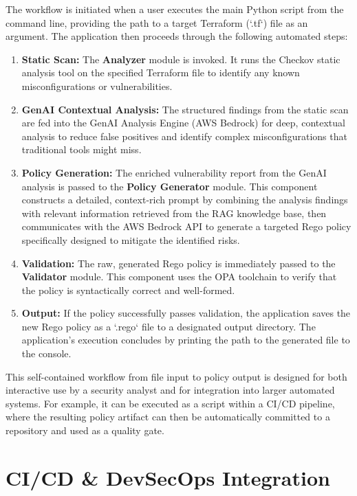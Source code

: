 The workflow is initiated when a user executes the main Python script from the command line, providing the path to a target Terraform (`.tf`) file as an argument. The application then proceeds through the following automated steps:

\begin{enumerate}
    \item \textbf{Static Scan:} The \textbf{Analyzer} module is invoked. It runs the Checkov static analysis tool on the specified Terraform file to identify any known misconfigurations or vulnerabilities.
    \item \textbf{GenAI Contextual Analysis:} The structured findings from the static scan are fed into the GenAI Analysis Engine (AWS Bedrock) for deep, contextual analysis to reduce false positives and identify complex misconfigurations that traditional tools might miss.
    \item \textbf{Policy Generation:} The enriched vulnerability report from the GenAI analysis is passed to the \textbf{Policy Generator} module. This component constructs a detailed, context-rich prompt by combining the analysis findings with relevant information retrieved from the RAG knowledge base, then communicates with the AWS Bedrock API to generate a targeted Rego policy specifically designed to mitigate the identified risks.
    \item \textbf{Validation:} The raw, generated Rego policy is immediately passed to the \textbf{Validator} module. This component uses the OPA toolchain to verify that the policy is syntactically correct and well-formed.
    \item \textbf{Output:} If the policy successfully passes validation, the application saves the new Rego policy as a `.rego` file to a designated output directory. The application's execution concludes by printing the path to the generated file to the console.
\end{enumerate}

This self-contained workflow from file input to policy output is designed for both interactive use by a security analyst and for integration into larger automated systems. For example, it can be executed as a script within a CI/CD pipeline, where the resulting policy artifact can then be automatically committed to a repository and used as a quality gate.

\section{CI/CD \& DevSecOps Integration}

